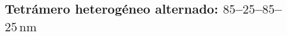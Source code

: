 \subsection{Tetrámero heterogéneo alternado: $85$--$25$--$85$--$25\,\text{nm}$}
\label{subsec:tetramero_alterno}
